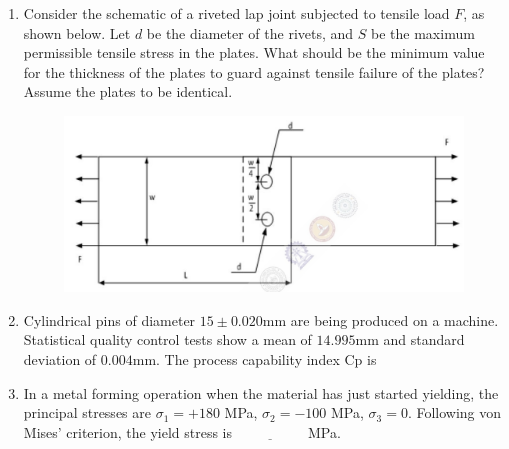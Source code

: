 \documentclass[journal]{IEEEtran}
\begin{document}
\begin{enumerate}[leftmargin=0pt]
    \item Consider the schematic of a riveted lap joint subjected to tensile load $F$, as shown below. Let $d$ be the diameter of the rivets, and $S$ be the maximum permissible tensile stress in the plates. What should be the minimum value for the thickness of the plates to guard against tensile failure of the plates? Assume the plates to be identical.
    \begin{figure}[h]
\centering
\includegraphics[width=0.5\columnwidth]{Figs/image (23).png}
\caption*{}
\label{fig:19}
\end{figure}

    \hfill{}

    \begin{enumerate}
    \end{enumerate}

    \item Cylindrical pins of diameter $15 \pm 0.020$mm are being produced on a machine. Statistical quality control tests show a mean of $14.995$mm and standard deviation of $0.004$mm. The process capability index $\text{Cp}$ is

    \hfill{}

    \begin{enumerate}
    \end{enumerate}

    \item In a metal forming operation when the material has just started yielding, the principal stresses are $\sigma_1 = +180$ MPa, $\sigma_2 = -100$ MPa, $\sigma_3 = 0$. Following von Mises' criterion, the yield stress is $\underline{\hspace{2cm}}$ MPa.
    \hfill{}


\end{enumerate}
\end{document}
